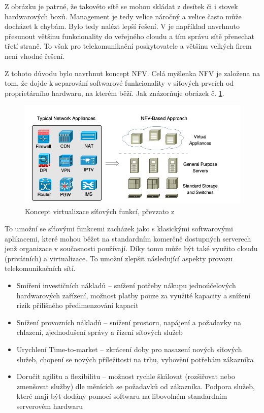 Z obrázku je patrné, že takovéto sítě se mohou skládat z desítek či i stovek hardwarových boxů. Management je tedy velice náročný a velice často může docházet k chybám. Bylo tedy nalézt lepší řešení. V \cite{Middleboxes} je například navrhnuto přesunout většinu funkcionality do veřejného cloudu a tím správu sítě přenechat třetí straně. To však pro telekomunikační poskytovatele a většinu velkých firem není vhodné řešení. 

Z tohoto důvodu bylo navrhnut koncept NFV. Celá myšlenka NFV je založena na tom, že dojde k separování softwarové funkcionality v síťových prvcích od proprietárního hardwaru, na kterém běží. Jak znázorňuje obrázek č. \ref{fig:vize_NFV}. 

\begin{figure}[h]
\begin{centering}
\includegraphics[scale=0.5]{images/vize_NFV}
\par\end{centering}
\caption{Koncept virtualizace síťových funkcí, převzato z \cite{NFVChalanges}\label{fig:vize_NFV}}
\end{figure}

To umožní se síťovými funkcemi zacházek jako s klasickými softwarovými aplikacemi, které mohou běžet na standardním komerčně dostupných serverech jenž organizace v současnosti používají. Díky tomu může být také využito cloudu (privátních) a virtualizace. To umožní zlepšit následující aspekty provozu telekomunikačních sítí.

\begin{itemize}
\item Smíření investičních nákladů – snížení potřeby nákupu jednoúčelových hardwarových zařízení, možnost platby pouze za využité kapacity a snížení rizik přílišného předimenzování kapacit
\item Snížení provozních nákladů – snížení prostoru, napájení a požadavky na chlazení, zjednodušení správy a řízení síťových služeb
\item Urychlení Time-to-market – zkrácení doby pro nasazení nových síťových služeb, chopení se nových příležitosti na trhu, vyhovění potřebám zákazníka
\item Doručit agilitu a flexibilitu – možnost rychle škálovat (rozšiřovat nebo zmenšovat služby) dle měnících se požadavků od zákazníka. Podpora služeb, které mají být dodány pomocí softwaru na libovolném standardním serverovém hardwaru
\end{itemize}

